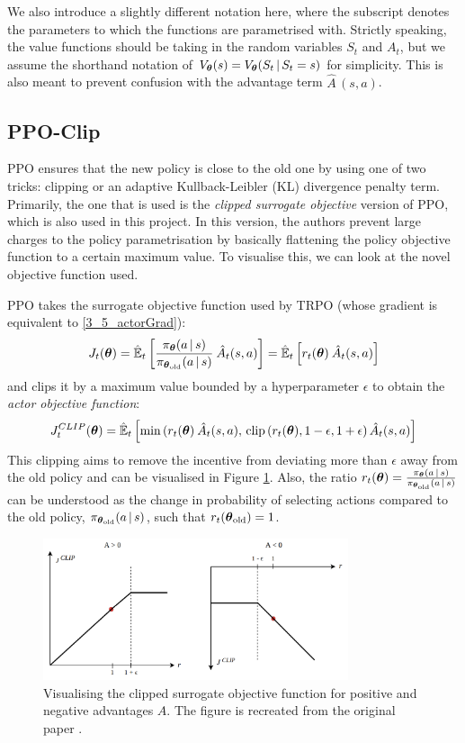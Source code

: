 We also introduce a slightly different notation here, where the subscript denotes the parameters to which the functions are parametrised with. Strictly speaking, the value functions should be taking in the random variables $S_t$ and $A_t$, but we assume the shorthand notation of $V_{\boldsymbol{\theta}} (s) = V_{\boldsymbol{\theta}} (S_t \,|\, S_t = s)$ for simplicity. This is also meant to prevent confusion with the advantage term $\hat{A}\,(s,a)$.

\subsection{PPO-Clip}
\label{subsec:PPO-clip}

PPO ensures that the new policy is close to the old one by using one of two tricks: clipping or an adaptive Kullback-Leibler (KL) divergence penalty term. Primarily, the one that is used is the \textit{clipped surrogate objective} version of PPO, which is also used in this project. In this version, the authors prevent large charges to the policy parametrisation by basically flattening the policy objective function to a certain maximum value. To visualise this, we can look at the novel objective function used.

PPO takes the surrogate objective function used by TRPO (whose gradient is equivalent to \eqref{3_5_actorGrad}):
\begin{equation}
    J_t(\boldsymbol{\theta}) = \hat{\mathbb{E}}_t \left[ 
    \frac{\pi_{\boldsymbol{\theta}} (a \, | \, s)}{\pi_{\boldsymbol{\theta}_\text{old}} (a \, | \, s)} \: \hat{A}_t (s, a) 
    \right]
    = \hat{\mathbb{E}}_t \left[ 
    r_t(\boldsymbol{\theta}) \: \hat{A}_t (s, a) 
    \right]
\end{equation}
and clips it by a maximum value bounded by a hyperparameter $\epsilon$ to obtain the \textit{actor objective function}:
\begin{equation}
    J_t^{CLIP}(\boldsymbol{\theta}) = \hat{\mathbb{E}}_t \left[ \min\,(
    r_t(\boldsymbol{\theta}) \: \hat{A}_t (s, a), \, \text{clip}\, ( r_t(\boldsymbol{\theta}), 1-\epsilon, 1+\epsilon) \, \hat{A}_t(s,a)
    \right]
    \label{3_5_clippedObjective}
\end{equation}
This clipping aims to remove the incentive from deviating more than $\epsilon$ away from the old policy \cite{PPO} and can be visualised in Figure \ref{fig:3_5_clippedLoss}. Also, the ratio $r_t(\boldsymbol{\theta}) = \frac{\pi_{\boldsymbol{\theta}} (a \, | \, s)}{\pi_{\boldsymbol{\theta}_\text{old}} (a \, | \, s)}$ can be understood as the change in probability of selecting actions compared to the old policy, $\pi_{\boldsymbol{\theta}_\text{old}} (a \, | \, s)$, such that $r_t(\boldsymbol{\theta}_{\text{old}}) = 1$.
\begin{figure}[htb]
    \centering
    \includegraphics[width=0.8\textwidth]{figures/3_/3_5_clippedLoss.png}
    \caption{Visualising the clipped surrogate objective function for positive and negative advantages $A$. The figure is recreated from the original paper \cite{PPO}.}
    \label{fig:3_5_clippedLoss}
\end{figure}

